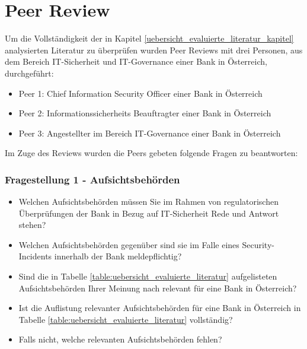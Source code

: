 
\section{Peer Review}
\label{peer_review}
Um die Vollständigkeit der in Kapitel \ref{uebersicht_evaluierte_literatur_kapitel} analysierten Literatur zu überprüfen wurden Peer Reviews mit drei Personen, aus dem Bereich IT-Sicherheit und IT-Governance einer Bank in Österreich, durchgeführt:
\bigbreak
\begin{itemize}
    \item Peer 1: Chief Information Security Officer einer Bank in Österreich
    \item Peer 2: Informationssicherheits Beauftragter einer Bank in Österreich
    \item Peer 3: Angestellter im Bereich IT-Governance einer Bank in Österreich
\end{itemize}
\bigbreak

Im Zuge des Reviews wurden die Peers gebeten folgende Fragen zu beantworten:
\subsubsection{Fragestellung 1 - Aufsichtsbehörden}
\begin{itemize}
    \item Welchen Aufsichtsbehörden müssen Sie im Rahmen von regulatorischen Überprüfungen der Bank in Bezug auf IT-Sicherheit Rede und Antwort stehen?
    \item Welchen Aufsichtsbehörden gegenüber sind sie im Falle eines Security-Incidents innerhalb der Bank meldepflichtig?
    \item Sind die in Tabelle \ref{table:uebersicht_evaluierte_literatur} aufgelisteten Aufsichtsbehörden Ihrer Meinung nach relevant für eine Bank in Österreich?
    \item Ist die Auflistung relevanter Aufsichtsbehörden für eine Bank in Österreich in Tabelle \ref{table:uebersicht_evaluierte_literatur} vollständig?
    \item Falls nicht, welche relevanten Aufsichtsbehörden fehlen?
\end{itemize}
